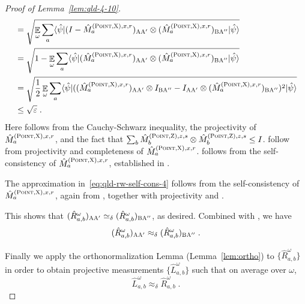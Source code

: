 \documentclass[11pt]{article}
\theoremstyle{definition}
\newcommand{\ket}[1]{|#1\rangle}
\newcommand{\bra}[1]{\langle#1|}
\newcommand{\Id}{\ensuremath{I}}
\newcommand{\ot}{\otimes}
\newcommand{\eps}{\varepsilon}
\newcommand{\E}{\mathop{\mathbb{E}}\displaylimits}
\newcommand{\labelstyle}[1]{\ensuremath{\textsc{#1}}\xspace}
\newcommand{\xpt}{\labelstyle{X}}
\newcommand{\zpt}{\labelstyle{Z}}
\newcommand{\alice}{\labelstyle{A}}
\newcommand{\bob}{\labelstyle{B}}
\newcommand{\typestyle}[1]{\ensuremath{\textsc{#1}}\xspace}
\newcommand{\Point}{\typestyle{Point}}
\begin{document}
\begin{proof}[Proof of Lemma~\ref{lem:qld-4-10}]
\begin{align}
                &= \sqrt{\E_\omega \sum_{a} \bra{\hat{\psi}} (\Id - \hat{M}^{(\Point,\xpt),x,r}_{a})_{\alice \alice'} \otimes (\hat{M}^{(\Point,\xpt),x,r}_{a})_{\bob \alice''} \ket{\hat{\psi}}} \label{eq:qld-rw-self-cons-3-2}\\
                &= \sqrt{ 1 - \E_{\omega} \sum_a \bra{\hat{\psi}} (\hat{M}^{(\Point,\xpt),x,r}_{a})_{\alice \alice'} \ot  (\hat{M}^{(\Point,\xpt),x,r}_{a})_{\bob \alice''} \ket{\hat{\psi}}} \label{eq:qld-rw-self-cons-3-3}\\
                &=\sqrt{ \frac{1}{2} \E_{\omega} \sum_a \bra{\hat{\psi}} ( (\hat{M}^{(\Point,\xpt),x,r}_{a})_{\alice \alice'} \ot I_{\bob \alice''} - I_{\alice \alice'} \ot  (\hat{M}^{(\Point,\xpt),x,r}_{a})_{\bob \alice''})^2 \ket{\hat{\psi}}} \label{eq:qld-rw-self-cons-3-4}\\
		&\leq \sqrt{\eps}\;. \label{eq:qld-rw-self-cons-3-5}
	\end{align}
	Here  follows from the Cauchy-Schwarz inequality, the projectivity of $\hat{M}^{(\Point,\xpt),x,r}_{a}$, and the fact that $\sum_b \hat{M}^{(\Point,\zpt),z,s}_{b} \otimes \hat{M}^{(\Point,\zpt),z,s}_{b} \leq \Id$.  follow from projectivity and completeness of $\hat{M}^{(\Point, \xpt), x, r}_{a}$.  follows from the self-consistency of $\hat{M}^{(\Point,\xpt),x,r}_{a}$, established in . 

        The approximation in~\eqref{eq:qld-rw-self-cons-4} follows from the self-consistency of $\hat{M}^{(\Point, \xpt), x, r}_a$, again from , together with projectivity and .

        
	
	This shows that $(\hat{R}^\omega_{a,b})_{\alice \alice'} \simeq_\delta (\hat{R}^\omega_{a,b})_{\bob \alice''}$, as desired. Combined with , we have
	\begin{equation}
		\label{eq:rw-sc}
		(\hat{R}^\omega_{a,b})_{\alice \alice'} \approx_\delta (\hat{R}^\omega_{a,b})_{\bob \alice''}\;.
	\end{equation}


		Finally we apply the orthonormalization Lemma (Lemma~\ref{lem:ortho}) to $\{ \hat{R}^\omega_{a,b} \}$ in order to obtain projective measurements $\{ \hat{L}^\omega_{a,b} \}$ such that on average over $\omega$,
	\begin{equation}\label{eq:rl-close}
		\hat{L}^\omega_{a,b} \approx_{\delta} \hat{R}^\omega_{a,b}\;.
	\end{equation}
	

\end{proof}
\end{document}
